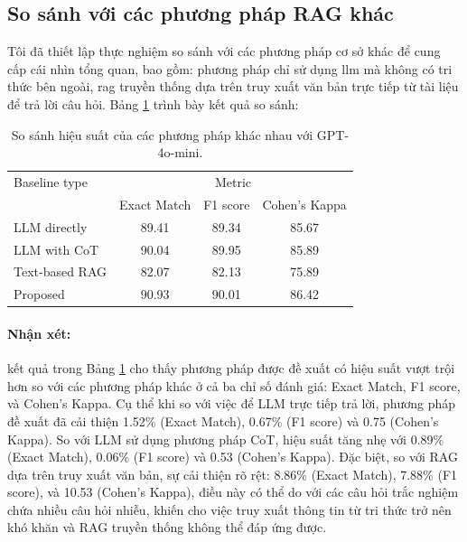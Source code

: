 \subsection{So sánh với các phương pháp RAG khác}
Tôi đã thiết lập thực nghiệm so sánh với các phương pháp cơ sở khác để cung cấp cái nhìn tổng quan, bao gồm: phương pháp chỉ sử dụng \gls{llm} mà không có tri thức bên ngoài, \gls{rag} truyền thống dựa trên truy xuất văn bản trực tiếp từ tài liệu để trả lời câu hỏi. Bảng \ref{tab:baseline_comparison} trình bày kết quả so sánh:
\begin{table}[ht]
    \centering
    \caption{So sánh hiệu suất của các phương pháp khác nhau với GPT-4o-mini.}
    \small{
        \begin{tabular}{lccc}
            \toprule
            Baseline type  & \multicolumn{3}{c}{Metric}                            \\
            \cmidrule(lr){2-4}
                           & Exact Match                & F1 score & Cohen’s Kappa \\
            \midrule
            LLM directly   & 89.41                      & 89.34    & 85.67         \\
            LLM with CoT   & 90.04                      & 89.95    & 85.89         \\
            Text-based RAG & 82.07                      & 82.13    & 75.89         \\
            Proposed       & 90.93                      & 90.01    & 86.42         \\
            \bottomrule
        \end{tabular}}


    \label{tab:baseline_comparison}
\end{table}
\paragraph{Nhận xét:} kết quả trong Bảng \ref{tab:baseline_comparison} cho thấy phương pháp được đề xuất có hiệu suất vượt trội hơn so với các phương pháp khác ở cả ba chỉ số đánh giá: Exact Match, F1 score, và Cohen’s Kappa. Cụ thể khi so với việc để LLM trực tiếp trả lời, phương pháp đề xuất đã cải thiện 1.52\% (Exact Match), 0.67\% (F1 score) và 0.75 (Cohen’s Kappa). So với LLM sử dụng phương pháp CoT, hiệu suất tăng nhẹ với 0.89\% (Exact Match), 0.06\% (F1 score) và 0.53 (Cohen’s Kappa). Đặc biệt, so với RAG dựa trên truy xuất văn bản, sự cải thiện rõ rệt: 8.86\% (Exact Match), 7.88\% (F1 score), và 10.53 (Cohen’s Kappa), điều này có thể do với các câu hỏi trắc nghiệm chứa nhiều câu hỏi nhiễu, khiến cho việc truy xuất thông tin từ tri thức trở nên khó khăn và RAG truyền thống không thể đáp ứng được.


